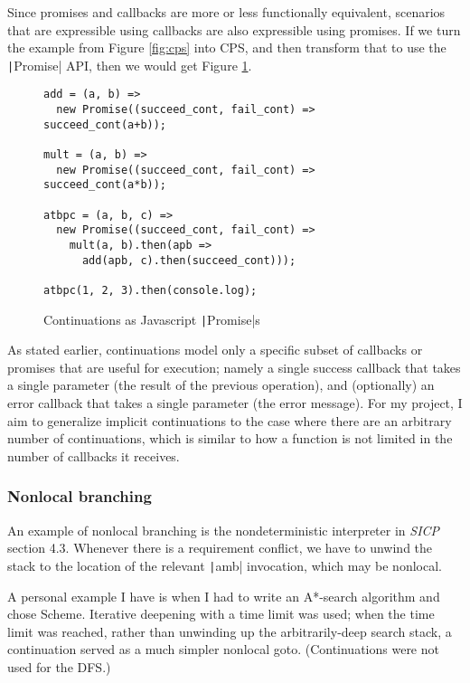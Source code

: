 \documentclass[]{article}
\begin{document}
Since promises and callbacks are more or less functionally equivalent, scenarios that are expressible using callbacks are also expressible using promises. If we turn the example from Figure \ref{fig:cps} into CPS, and then transform that to use the \texttt|Promise| API, then we would get Figure \ref{fig:prom}.

\begin{figure}[h]
  \centering
\begin{verbatim}
add = (a, b) =>
  new Promise((succeed_cont, fail_cont) => succeed_cont(a+b));

mult = (a, b) =>
  new Promise((succeed_cont, fail_cont) => succeed_cont(a*b));

atbpc = (a, b, c) =>
  new Promise((succeed_cont, fail_cont) =>
    mult(a, b).then(apb =>
      add(apb, c).then(succeed_cont)));

atbpc(1, 2, 3).then(console.log);
\end{verbatim}
  \caption{Continuations as Javascript \texttt|Promise|s}
  \label{fig:prom}
\end{figure}

As stated earlier, continuations model only a specific subset of callbacks or promises that are useful for execution; namely a single success callback that takes a single parameter (the result of the previous operation), and (optionally) an error callback that takes a single parameter (the error message). For my project, I aim to generalize implicit continuations to the case where there are an arbitrary number of continuations, which is similar to how a function is not limited in the number of callbacks it receives.

\subsubsection{Nonlocal branching}
\label{sec:nonl}

An example of nonlocal branching is the nondeterministic interpreter in \textit{SICP} section 4.3. Whenever there is a requirement conflict, we have to unwind the stack to the location of the relevant \texttt|amb| invocation, which may be nonlocal.

A personal example I have is when I had to write an A*-search algorithm and chose Scheme. Iterative deepening with a time limit was used; when the time limit was reached, rather than unwinding up the arbitrarily-deep search stack, a continuation served as a much simpler nonlocal goto. (Continuations were not used for the DFS.)
\end{document}
